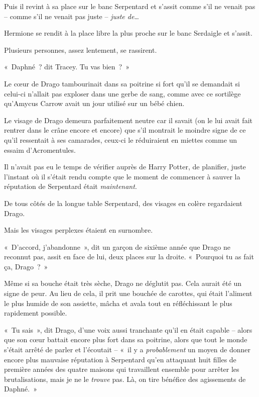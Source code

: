 Puis il revint à sa place sur le banc Serpentard et s'assit comme s'il ne venait pas -- comme s'il ne venait pas juste -- \emph{juste de}…

Hermione se rendit à la place libre la plus proche sur le banc Serdaigle et s'assit.

Plusieurs personnes, assez lentement, se rassirent.

«~Daphné~? dit Tracey. Tu vas bien~?~»

\later

Le cœur de Drago tambourinait dans sa poitrine si fort qu'il se demandait si celui-ci n'allait pas exploser dans une gerbe de sang, comme avec ce sortilège qu'Amycus Carrow avait un jour utilisé sur un bébé chien.

Le visage de Drago demeura parfaitement neutre car il savait (on le lui avait fait rentrer dans le crâne encore et encore) que s'il montrait le moindre signe de ce qu'il ressentait à ses camarades, ceux-ci le réduiraient en miettes comme un essaim d'Acromentules.

Il n'avait pas eu le temps de vérifier auprès de Harry Potter, de planifier, juste l'instant où il s'était rendu compte que le moment de commencer à sauver la réputation de Serpentard était \emph{maintenant}.

De tous côtés de la longue table Serpentard, des visages en colère regardaient Drago.

Mais les visages perplexes étaient en surnombre.

«~D'accord, j'abandonne~», dit un garçon de sixième année que Drago ne reconnut pas, assit en face de lui, deux places sur la droite. «~Pourquoi tu as fait ça, Drago~?~»

Même si sa bouche était très sèche, Drago ne déglutit pas. Cela aurait été un signe de peur. Au lieu de cela, il prit une bouchée de carottes, qui était l'aliment le plus humide de son assiette, mâcha et avala tout en réfléchissant le plus rapidement possible.

«~Tu sais~», dit Drago, d'une voix aussi tranchante qu'il en était capable -- alors que son cœur battait encore plus fort dans sa poitrine, alors que tout le monde s'était arrêté de parler et l'écoutait -- «~il y a \emph{probablement} un moyen de donner encore plus mauvaise réputation à Serpentard qu'en attaquant huit filles de première années des quatre maisons qui travaillent ensemble pour arrêter les brutalisations, mais je ne le \emph{trouve} pas. Là, on tire bénéfice des agissements de Daphné.~»

